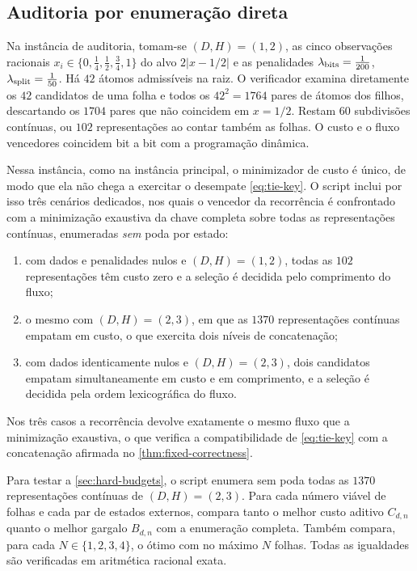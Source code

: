\subsection{Auditoria por enumeração direta}

Na instância de auditoria, tomam-se $(D,H)=(1,2)$, as cinco observações
racionais $x_i\in\{0,\tfrac14,\tfrac12,\tfrac34,1\}$ do alvo $2|x-1/2|$ e as
penalidades $\lambda_{\rm bits}=\tfrac1{200}$,
$\lambda_{\rm split}=\tfrac1{50}$. Há $42$ átomos admissíveis na
raiz. O verificador examina diretamente os $42$ candidatos de uma folha e
todos os $42^2=1764$ pares de átomos dos filhos, descartando os $1704$ pares
que não coincidem em $x=1/2$. Restam $60$ subdivisões contínuas, ou $102$
representações ao contar também as folhas. O custo e o fluxo vencedores
coincidem bit a bit com a programação dinâmica.

Nessa instância, como na instância principal, o minimizador de custo é único,
de modo que ela não chega a exercitar o desempate \eqref{eq:tie-key}. O script
inclui por isso três cenários dedicados, nos quais o vencedor da recorrência é
confrontado com a minimização exaustiva da chave completa sobre todas as
representações contínuas, enumeradas \emph{sem} poda por estado:
\begin{enumerate}[label=(\alph*),leftmargin=2em]
 \item com dados e penalidades nulos e $(D,H)=(1,2)$, todas as $102$
 representações têm custo zero e a seleção é decidida pelo comprimento do
 fluxo;
 \item o mesmo com $(D,H)=(2,3)$, em que as $1370$ representações contínuas
 empatam em custo, o que exercita dois níveis de concatenação;
 \item com dados identicamente nulos e $(D,H)=(2,3)$, dois candidatos empatam
 simultaneamente em custo e em comprimento, e a seleção é decidida pela ordem
 lexicográfica do fluxo.
\end{enumerate}
Nos três casos a recorrência devolve exatamente o mesmo fluxo que a
minimização exaustiva, o que verifica a compatibilidade de \eqref{eq:tie-key}
com a concatenação afirmada no \cref{thm:fixed-correctness}.

Para testar a \cref{sec:hard-budgets}, o script enumera sem poda todas as
$1370$ representações contínuas de $(D,H)=(2,3)$. Para cada número viável de
folhas e cada par de estados externos, compara tanto o melhor custo aditivo
$C_{d,n}$ quanto o melhor gargalo $B_{d,n}$ com a enumeração completa. Também
compara, para cada $N\in\{1,2,3,4\}$, o ótimo com no máximo $N$ folhas. Todas
as igualdades são verificadas em aritmética racional exata.

